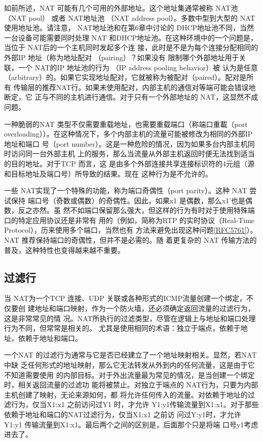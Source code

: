 如前所述，NAT 可能有几个可用的外部地址。这个地址集通常被称 NAT池（NAT
pool） 或者 NAT地址池 （NAT address pool）。多数中型到大型的 NAT 使用地址池。请注意，
NAT地址池和在第6章中讨论的 DHCP地址池不同，当然一台设备可能需要同时处理 NAT
和DHCP地址池。在这种环境中的一个问题是，当位于 NAT后的一个主机同时发起多个连
接，此时是不是为每个连接分配相同的外部IP 地址（称为地址配对 （pairing）？如果没有
限制哪个外部地址用于关联，一个 NAT的IP 地址池的行为 （IP address pooling behavior）被
认为是任意（arbitrary）的。如果它实现地址配对，它就被称为被配对（paired）。配对是所有
传输层的推荐NAT行。如果未使用配对，内部主机的通信对等端可能会错误地断定，它
正与不同的主机进行通信。对于只有一个外部地址的 NAT，这显然不成问题。

一种脆弱的NAT 类型不仅需要重载地址，也需要重载端口（称端口重載（port
overloading））。在这种情况下，多个内部主机的流量可能被修改为相同的外部IP地址和端口
号（port number）。这是一种危险的情况，因为如果多台内部主机同时访问同一台外部主机
上的服务，那么当流量从外部主机返回时便无法找到适当的目的地址。对于TCP 而言，这
是由多个外部连接共享连接标识符的4元组（源和目标地址及端口号）所导致的结果。现在
这种行为是不允许的。

一些 NAT实现了一个特殊的功能，称为端口奇偶性（port parity）。这种 NAT 尝试保持
端口号（奇数或偶数）的奇偶性。因此，如果x1 是偶数，那么x1'也是偶数，反之亦然。虽
然不如端口保留那么强大，但这样的行为有时对于使用特殊端口的特定应用协议还是非常有
用的（例如，简称为RTP 的实时协议（Real-Time Protocol），历来使用多个端口，当然也有
方法来避免出现这种问题\href{https://www.rfc-editor.org/rfc/rfc5761}{[RFC5761]}）。NAT
推荐保持端口的奇偶性，但并不是必需的。随
着更复杂的 NAT 传输方法的普及，这种特性也变得越来越不重要。

\subsection{过滤行}

当 NAT为一个TCP 连接、UDP 关联或各种形式的ICMP流量创建一个绑定，不仅要创
建地址和端口映射，作为一个防火墙，还必须确定返回流量的过滤行为，这是非常常见的情
况。NAT所执行的过滤类型，尽管在逻辑上与地址和端口处理行为不同，但常常是相关的。
尤其是使用相同的术语：独立于端点，依赖于地址，依赖于地址和端口。

一个NAT 的过滤行为通常与它是否已经建立了一个地址映射相关。显然，若NAT 中缺
乏任何形式的地址映射，那么它无法转发从外到内的任何流量，这是由于它不知道需要使用
的内部目标。对于外出流量最为常见的情况，是当创建一个绑定时，相关返回流量的过滤功
能将被禁止。对独立于端点的 NAT行为，只要为内部主机创建了映射，无论来源如何，都
将允许任何传入的流量。对依赖于地址的过滤行为，仅当X1:x1 之前访问过Y1 时，才允许
Y1:y1传输流量到X1:x1。对于那些依赖于地址和端口的NAT过滤行为，仅当X1:x1 之前访
问过Y:y1时，才允许 Y1:y1 传输流量到X1:x1。最后两个之间的区别是，后面那个只是将端
口号y1考虑进去了。


